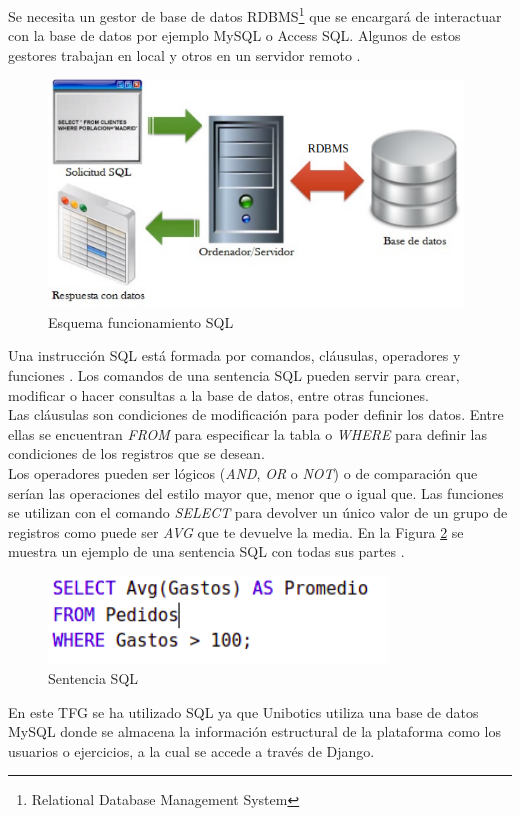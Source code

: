 Se necesita un gestor de base de datos RDBMS\footnote{Relational Database Management System}  que se encargará de interactuar con la base de datos por ejemplo MySQL o  Access SQL. Algunos de estos gestores trabajan en local y otros en un servidor remoto \cite{rdbms}.\\

\begin{figure}[H]
    \centering
    \includegraphics[width=11cm, keepaspectratio]{img/sql.png}
    \caption{Esquema funcionamiento SQL}
    \label{fig:sql}
\end{figure}
Una instrucción SQL está formada por comandos, cláusulas, operadores y funciones . Los comandos de una sentencia SQL pueden servir para crear, modificar o hacer consultas a la base de datos, entre otras funciones.\\

Las cláusulas son condiciones de modificación para poder definir los datos. Entre ellas se encuentran \textit{FROM} para especificar la tabla o \textit{WHERE} para definir las condiciones de los registros que se desean.\\

Los operadores pueden ser lógicos (\textit{AND}, \textit{OR} o \textit{NOT}) o de comparación que serían las operaciones del estilo mayor que, menor que o igual que. Las funciones se utilizan con el comando \textit{SELECT} para devolver un único valor de un grupo de registros como puede ser\textit{ AVG }que te devuelve la media. En la Figura \ref{fig:ejsql} se muestra un ejemplo de una sentencia SQL con todas sus partes \cite{sql}.\\

\begin{figure}[H]
    \centering
    \includegraphics[width=9cm, keepaspectratio]{img/ejsql.png}
    \caption{Sentencia SQL}
    \label{fig:ejsql}
\end{figure}
En este TFG se ha utilizado SQL ya que Unibotics utiliza una base de datos MySQL donde se almacena la información estructural de la plataforma como los usuarios o ejercicios, a la cual se accede a través de Django.

